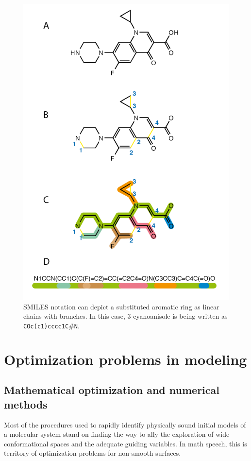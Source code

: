 \begin{figure}[H]
	\begin{center}
	\includegraphics[height=0.9\textheight]{./figures/02/smiles.png}
	\end{center}
	\cprotect\caption[SMILES notation]{SMILES notation can depict a substituted aromatic ring as linear chains with branches. In this case, 3-cyanoanisole is being written as \texttt{COc(c1)cccc1C$\# $N}.}
	\label{fig:smiles}
\end{figure}


\section{Optimization problems in modeling}
\subsection{Mathematical optimization and numerical methods}
Most of the procedures used to rapidly identify physically sound initial models of a molecular system stand on finding the way to ally the exploration of wide conformational spaces and the adequate guiding variables. In math speech, this is territory of optimization problems for non-smooth surfaces.

